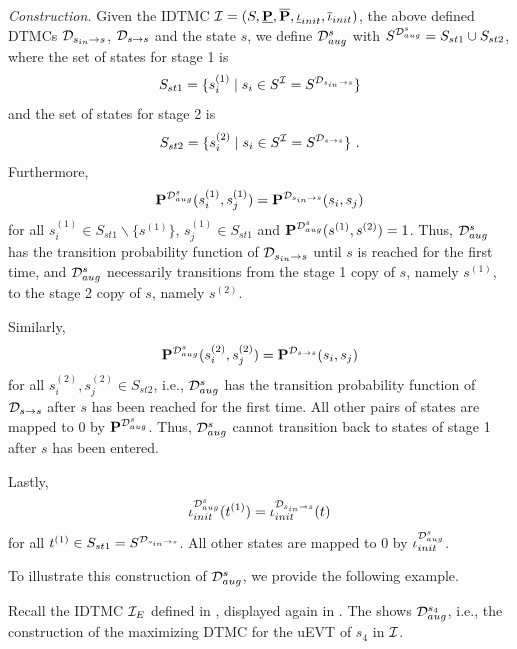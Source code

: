 \emph{Construction.} Given the IDTMC $\mathcal{I} = (S,\mathbf{\underline{P}},\mathbf{\overline{P}},\mathbf{\underline{\iota}}_{init},\mathbf{\overline{\iota}}_{init})$, the above defined DTMCs $\mathcal{D}_{s_{in}\rightarrow s}$, $\mathcal{D}_{s\rightarrow s}$ and the state $s$, 
we define $\mathcal{D}_{aug}^s$ with $S^{\mathcal{D}_{aug}^s}=S_{st1}\cup S_{st2}$, where the set of states for stage 1 is 
\[S_{st1}=\{s_i^{(1)} \mid s_i\in S^{\mathcal{I}} = S^{\mathcal{D}_{s_{in}\rightarrow s}}\}\] 
and the set of states for stage 2 is 
\[S_{st2} = \{s_i^{(2)}\mid s_i\in S^{\mathcal{I}} = S^{\mathcal{D}_{s\rightarrow s}}\}\ .\]
Furthermore, 
\[\mathbf{P}^{\mathcal{D}_{aug}^s}(s_i^{(1)},s_j^{(1)})=\mathbf{P}^{\mathcal{D}_{s_{in}\rightarrow s}}(s_i,s_j)\] 
for all $s_i^{(1)}\in S_{st1}\backslash \{s^{(1)}\}$, $s_j^{(1)}\in S_{st1}$ and $\mathbf{P}^{\mathcal{D}_{aug}^s}(s^{(1)},s^{(2)}) = 1$.
Thus, $\mathcal{D}_{aug}^s$ has the transition probability function of $\mathcal{D}_{s_{in}\rightarrow s}$ until $s$ is reached for the first time, and $\mathcal{D}_{aug}^s$ necessarily transitions from the stage 1 copy of $s$, namely $s^{(1)}$, to the stage 2 copy of $s$, namely $s^{(2)}$.

Similarly, 
\[\mathbf{P}^{\mathcal{D}_{aug}^s}(s_i^{(2)},s_j^{(2)})=\mathbf{P}^{\mathcal{D}_{s\rightarrow s}}(s_i,s_j)\]
for all $s_i^{(2)},s_j^{(2)}\in S_{st2}$, i.e., $\mathcal{D}_{aug}^s$ has the transition probability function of $\mathcal{D}_{s\rightarrow s}$ after $s$ has been reached for the first time.
All other pairs of states are mapped to $0$ by $\mathbf{P}^{\mathcal{D}_{aug}^s}$. Thus, $\mathcal{D}_{aug}^s$ cannot transition back to states of stage 1 after $s$ has been entered.

Lastly, 
\[\iota_{init}^{\mathcal{D}_{aug}^s}(t^{(1)}) = \iota_{init}^{\mathcal{D}_{s_{in}\rightarrow s}}(t)\] 
for all $t^{(1)}\in S_{st1} = S^{\mathcal{D}_{s_{in}\rightarrow s}}$. All other states are mapped to $0$ by $\iota_{init}^{\mathcal{D}_{aug}^s}$.

To illustrate this construction of $\mathcal{D}_{aug}^s$, we provide the following example.
\begin{example}
    Recall the IDTMC $\mathcal{I}_E$ defined in , displayed again in . The  shows $\mathcal{D}_{aug}^{s_4}$, i.e., the construction of the maximizing DTMC for the uEVT of $s_4$ in $\mathcal{I}$.
\end{example}
            
